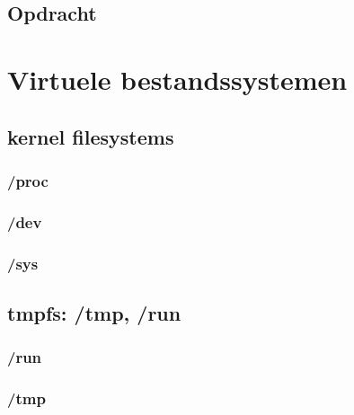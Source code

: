 \documentclass[a4paper,12pt,twoside,openright,titlepage]{book}
\begin{document}
\section{Opdracht}


\chapter{Virtuele bestandssystemen}
\section{kernel filesystems}
\subsection{/proc}
\subsection{/dev}

\subsection{/sys}

\section{tmpfs: /tmp, /run}
\subsection{/run}
\subsection{/tmp}

\printindex
\end{document}
